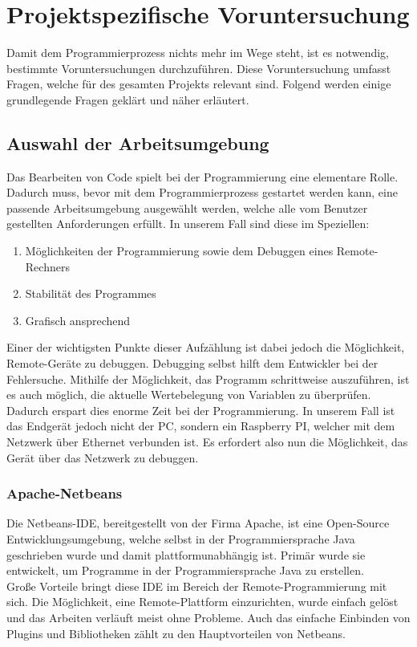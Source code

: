 \section{Projektspezifische Voruntersuchung}\label{sec:projektspezifische-voruntersuchung}
Damit dem Programmierprozess nichts mehr im Wege steht, ist es notwendig, bestimmte Voruntersuchungen durchzuführen.
Diese Voruntersuchung umfasst Fragen, welche für des gesamten Projekts relevant sind.
Folgend werden einige grundlegende Fragen geklärt und näher erläutert.
\subsection{Auswahl der Arbeitsumgebung}\label{subsec:auswahl-der-arbeitsumgebung}
Das Bearbeiten von Code spielt bei der Programmierung eine elementare Rolle.
Dadurch muss, bevor mit dem Programmierprozess gestartet werden kann, eine passende Arbeitsumgebung ausgewählt werden, welche alle vom Benutzer gestellten Anforderungen erfüllt.
In unserem Fall sind diese im Speziellen:
\begin{enumerate}
    \item Möglichkeiten der Programmierung sowie dem Debuggen eines Remote-Rechners
    \item Stabilität des Programmes
    \item Grafisch ansprechend
\end{enumerate}
Einer der wichtigsten Punkte dieser Aufzählung ist dabei jedoch die Möglichkeit, Remote-Geräte zu debuggen.
Debugging selbst hilft dem Entwickler bei der Fehlersuche.
Mithilfe der Möglichkeit, das Programm schrittweise auszuführen, ist es auch möglich, die aktuelle Wertebelegung von Variablen zu überprüfen.
Dadurch erspart dies enorme Zeit bei der Programmierung.
In unserem Fall ist das Endgerät jedoch nicht der PC, sondern ein Raspberry PI, welcher mit dem Netzwerk über Ethernet verbunden ist.
Es erfordert also nun die Möglichkeit, das Gerät über das Netzwerk zu debuggen.
\subsubsection{Apache-Netbeans}
Die Netbeans-IDE, bereitgestellt von der Firma Apache, ist eine Open-Source Entwicklungsumgebung, welche selbst in der Programmiersprache Java geschrieben wurde und damit plattformunabhängig ist.
Primär wurde sie entwickelt, um Programme in der Programmiersprache Java zu erstellen.\\
Große Vorteile bringt diese IDE im Bereich der Remote-Programmierung mit sich.
Die Möglichkeit, eine Remote-Plattform einzurichten, wurde einfach gelöst und das Arbeiten verläuft meist ohne Probleme.
Auch das einfache Einbinden von Plugins und Bibliotheken zählt zu den Hauptvorteilen von Netbeans.
